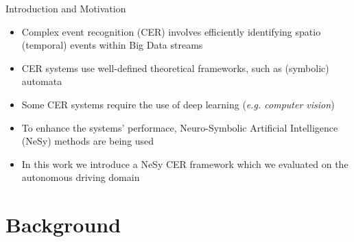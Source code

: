 \documentclass[10pt, aspectratio=169]{beamer}
\begin{document}
\begin{frame}{Introduction and Motivation}
    \begin{itemize}
        \setlength{\itemsep}{12pt}
        \item \textcolor{umBlueLighter}{Complex event recognition (CER)} involves efficiently identifying spatio (temporal) events within Big Data streams 
        \item CER systems use well-defined theoretical frameworks, such as (symbolic) automata
        \item Some CER systems require the use of \textcolor{umBlueLighter}{deep learning} (\textit{e.g. computer vision})
        \item To enhance the systems' performace, \textcolor{umBlueLighter}{Neuro-Symbolic Artificial Intelligence (NeSy)} methods are being used
        \item In this work we introduce a NeSy CER framework which we evaluated on the autonomous driving domain
    \end{itemize}
\end{frame}

\section{Background}
{
    \begin{frame}
        \sectionpage%
    \end{frame}
}
\end{document}
